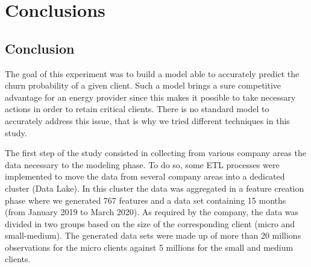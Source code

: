 \documentclass[LaM,binding=0.6cm, english]{sapthesis}
\begin{document}
\begin{table}[!htb]
\centering
{}
\vspace{2mm}
\caption{Final model results for different thresholds}
\label{final_results_summary}
\end{table}


\chapter{Conclusions}

\section{Conclusion}

The goal of this experiment was to build a model able to accurately predict the churn probability of a given client. Such a model brings a sure competitive advantage for an energy provider since this makes it possible to take necessary actions in order to retain critical clients. There is no standard model to accurately address this issue, that is why we tried different techniques in this study.

The first step of the study consisted in collecting from various company areas the data necessary to the modeling phase. To do so, some ETL processes were implemented to move the data from several company areas into a dedicated cluster (Data Lake). In this cluster the data was aggregated in a feature creation phase where we generated 767 features and a data set containing 15 months (from January 2019 to March 2020). As required by the company, the data was divided in two groups based on the size of the corresponding client (micro and small-medium). The generated data sets were made up of more than 20 millions observations for the micro clients against 5 millions for the small and medium clients.
\end{document}
